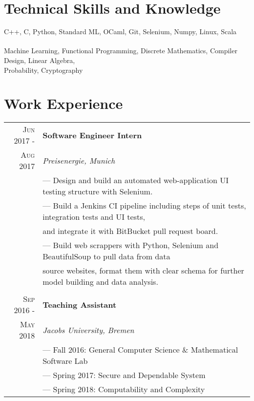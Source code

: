 \documentclass[a4paper,10pt]{article}
\begin{document}
	
	\section{Technical Skills and Knowledge}
		C++, C, Python, Standard ML, OCaml, Git, Selenium, Numpy, Linux, Scala\\
		~\\
		Machine Learning, Functional Programming, Discrete Mathematics, Compiler Design, Linear Algebra,\\
		Probability, Cryptography
	
	\section{Work Experience}
	\begin{tabular}{r|l}
		\textsc{Jun 2017 - } & \textbf{Software Engineer Intern} \\\textsc{Aug 2017}&\emph{Preisenergie, Munich}
		\\& --- Design and build an automated web-application UI testing structure with Selenium.
		\\& --- Build a Jenkins CI pipeline including steps of unit tests, integration tests and UI tests,\\& and integrate it with BitBucket pull request board.
		\\& --- Build web scrappers with Python, Selenium and BeautifulSoup to pull data from data\\& source websites, format them with clear schema for further model building and data analysis.
		\\ \multicolumn{1}{c}{} \\
		\textsc{Sep 2016 - } & \textbf{Teaching Assistant} \\\textsc{May 2018}&\emph{Jacobs University, Bremen}
		\\& --- Fall 2016: General Computer Science \& Mathematical Software Lab
		\\& --- Spring 2017: Secure and Dependable System
		\\& --- Spring 2018: Computability and Complexity

	\end{tabular}
	
\end{document}
